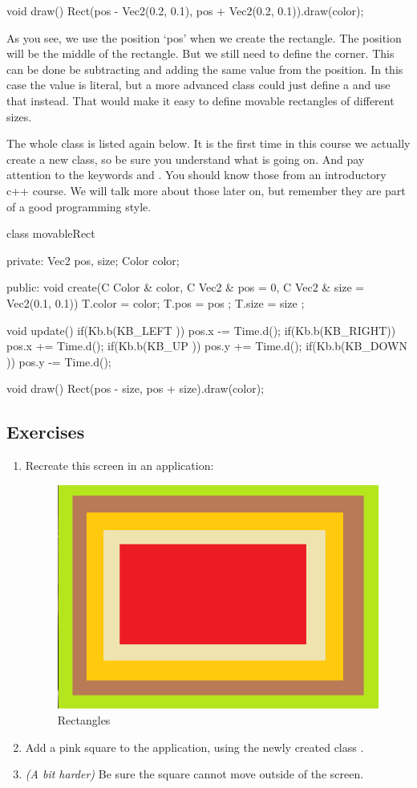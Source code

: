 \begin{code}
void draw() {
  Rect(pos - Vec2(0.2, 0.1), pos + Vec2(0.2, 0.1)).draw(color);
}
\end{code}

As you see, we use the position `pos' when we create the rectangle. The position will be the middle of the rectangle. But we still need to define the corner. This can be done be subtracting and adding the same value from the position. In this case the value is literal, but a more advanced class could just define a  and use that instead. That would make it easy to define movable rectangles of different sizes.

The whole class is listed again below. It is the first time in this course we actually create a new class, so be sure you understand what is going on. And pay attention to the keywords  and . You should know those from an introductory c++ course. We will talk more about those later on, but remember they are part of a good programming style.

\begin{code}
class movableRect {
private:
  Vec2 pos, size;
	Color color;
	
public:
  void create(C Color & color, C Vec2 & pos = 0, C Vec2 & size = Vec2(0.1, 0.1)) {
	  T.color = color;
		T.pos   = pos  ;
		T.size  = size ;
	}
	
	void update() {
		if(Kb.b(KB_LEFT )) pos.x -= Time.d();
		if(Kb.b(KB_RIGHT)) pos.x += Time.d();
		if(Kb.b(KB_UP   )) pos.y += Time.d();
		if(Kb.b(KB_DOWN )) pos.y -= Time.d();
	}
	
	void draw() {
		Rect(pos - size, pos + size).draw(color);
	}
}
\end{code}
	
\subsection{Exercises}

\begin{enumerate}
\item Recreate this screen in an application:

\begin{figure}[h]
\centering
\includegraphics[width=0.4\linewidth]{images/nested_rectangles.png}
\caption[]{Rectangles}
\label{fig:nested_rect}
\end{figure}

\item Add a pink square to the application, using the newly created class .
\item \textit{(A bit harder)} Be sure the square cannot move outside of the screen.
\end{enumerate}

